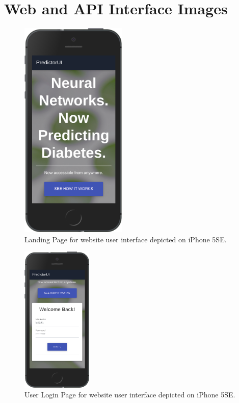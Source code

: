 \documentclass[12pt]{article}
\begin{document}
\section{Web and API Interface Images}
\vspace{3cm}
\begin{figure}[ht]
\centering
\includegraphics[width=0.45\textwidth]{1se.png}
\caption{\label{fig:50} Landing Page for website user interface depicted on iPhone 5SE.}
\end{figure}
\begin{figure}[ht]
\centering
\includegraphics[width=0.3\textwidth]{2se.png}
\caption{\label{fig:51} User Login Page for website user interface depicted on iPhone 5SE.}
\end{figure}
\end{document}
